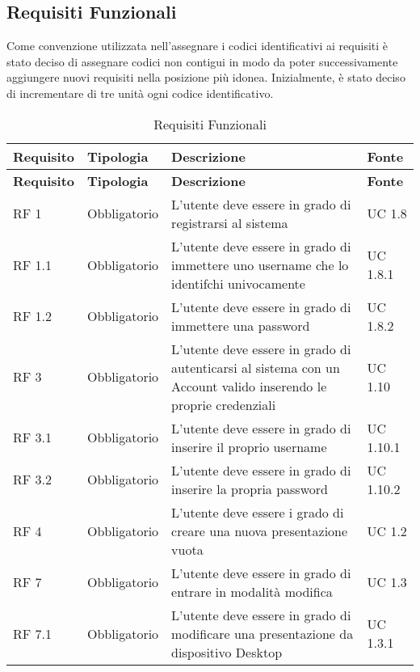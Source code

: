 \subsection{Requisiti Funzionali}{
	Come convenzione utilizzata nell'assegnare i codici identificativi ai requisiti è stato deciso di assegnare codici non contigui in modo da poter successivamente aggiungere nuovi requisiti nella posizione più idonea. Inizialmente, è stato deciso di incrementare di tre unità ogni codice identificativo.\\
	\renewcommand*{\arraystretch}{1.4}
	\begin{longtable} [c]{| p{2.5cm} | p{2.5cm} | p{6cm} |p{2.5cm}|}
		\caption{Requisiti Funzionali \label{tab:reqFunzionali}}\\
	 \hline
	 \textbf{Requisito} & \textbf{Tipologia} & \textbf{Descrizione} & \textbf{Fonte} \\
	 \hline
	 \endfirsthead
	 \hline
	 \textbf{Requisito} & \textbf{Tipologia} & \textbf{Descrizione} & \textbf{Fonte} \\
	 \hline
			\endhead
	 \hline
	 \endfoot
	 \hline
	 \endlastfoot
		RF 1 & Obbligatorio & L'utente deve essere in grado di registrarsi al sistema & UC 1.8\\
		\hline
		RF 1.1 & Obbligatorio & L'utente deve essere in grado di immettere uno username che lo identifchi univocamente & UC 1.8.1\\
		\hline
		RF 1.2 & Obbligatorio & L'utente deve essere in grado di immettere una password & UC 1.8.2\\
		\hline
		RF 3 & Obbligatorio & L'utente deve essere in grado di autenticarsi al sistema con un Account\ped{g} valido inserendo le proprie credenziali & UC 1.10\\
		\hline
		RF 3.1 & Obbligatorio & L'utente deve essere in grado di inserire il proprio username & UC 1.10.1\\		
		\hline
		RF 3.2 & Obbligatorio & L'utente deve essere in grado di inserire la propria password & UC 1.10.2\\
		\hline
		RF 4 & Obbligatorio & L’utente deve essere i grado di creare una nuova presentazione vuota & UC 1.2\\
		\hline	
		RF 7 & Obbligatorio & L'utente deve essere in grado di entrare in modalità modifica & UC 1.3\\
		\hline
		RF 7.1 & Obbligatorio & L'utente deve essere in grado di modificare una presentazione da dispositivo Desktop\ped{g} & UC 1.3.1\\						

\end{longtable}}
